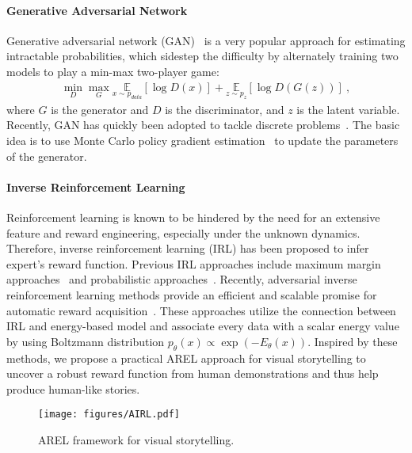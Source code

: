 \documentclass[11pt,a4paper]{article}
\newcommand{\expect}[1]{\ensuremath{\underset{#1}{\mathbb{E}}\xspace}}
\begin{document}
\paragraph{Generative Adversarial Network}
Generative adversarial network (GAN)~\cite{goodfellow2014generative} is a very popular approach for estimating intractable probabilities, which sidestep the difficulty by alternately training two models to play a min-max two-player game:
\begin{align*}
\min_{D}\max_{G} \expect{x \sim p_{data}}[\log D(x)] + \expect{z \sim p_{z}}[\log D(G(z))] ~,
\end{align*}
where $G$ is the generator and $D$ is the discriminator, and $z$ is the latent variable. Recently, GAN has quickly been adopted to tackle discrete problems~\cite{yu2017seqgan,Dai_2017_ICCV,wang2018show}. The basic idea is to use Monte Carlo policy gradient estimation~\cite{williams1992simple} to update the parameters of the generator.     

\paragraph{Inverse Reinforcement Learning}
Reinforcement learning is known to be hindered by the need for an extensive feature and reward engineering, especially under the unknown dynamics. Therefore, inverse reinforcement learning (IRL) has been proposed to infer expert's reward function. Previous IRL approaches include maximum margin approaches~\cite{abbeel2004apprenticeship,ratliff2006maximum} and probabilistic approaches~\cite{ziebart2010modeling,ziebart2008maximum}. Recently, adversarial inverse reinforcement learning methods provide an efficient and scalable promise for automatic reward acquisition~\cite{ho2016generative,finn2016connection,fu2017learning,henderson2017optiongan}. These approaches utilize the connection between IRL and energy-based model and associate every data with a scalar energy value by using Boltzmann distribution $p_{\theta}(x) \propto \exp (-E_{\theta}(x))$. Inspired by these methods, we propose a practical AREL approach for visual storytelling to uncover a robust reward function from human demonstrations and thus help produce human-like stories.

\begin{figure}
\begin{center}
\texttt{[image: figures/AIRL.pdf]}  
\end{center}
\vspace*{-1ex}
   \caption{AREL framework for visual storytelling.}
\label{fig:AREL}
\end{figure}
\end{document}
